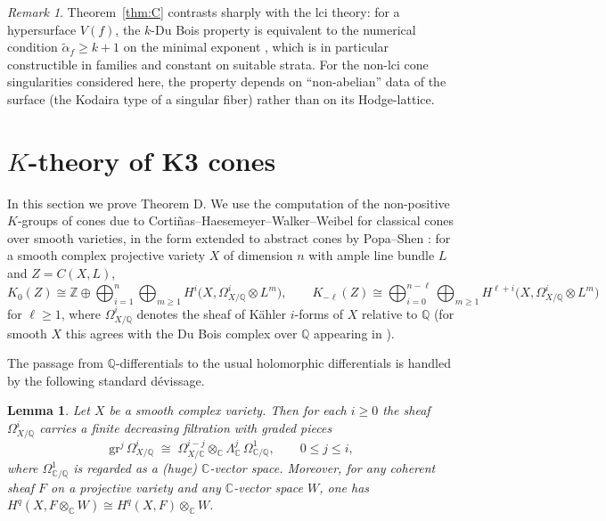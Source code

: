 \documentclass[11pt]{amsart}
\numberwithin{equation}{section}
\theoremstyle{plain}
\newtheorem{lemma}[theorem]{Lemma}
\theoremstyle{definition}
\theoremstyle{remark}
\newtheorem{remark}[theorem]{Remark}
\newcommand{\CC}{\mathbb{C}}
\newcommand{\QQ}{\mathbb{Q}}
\newcommand{\ZZ}{\mathbb{Z}}
\newcommand{\Kzero}{K_0}
\begin{document}
\begin{remark}
Theorem~\ref{thm:C} contrasts sharply with the lci theory: for a hypersurface $V(f)$, the $k$-Du Bois property is equivalent to the numerical condition $\widetilde\alpha_f\ge k+1$ on the minimal exponent \cite{MOPW,JKSY,Sai}, which is in particular constructible in families and constant on suitable strata.
For the non-lci cone singularities considered here, the property depends on ``non-abelian'' data of the surface (the Kodaira type of a singular fiber) rather than on its Hodge-lattice.
\end{remark}

\section{$K$-theory of K3 cones}\label{sec:ktheory}

In this section we prove Theorem D.
We use the computation of the non-positive $K$-groups of cones due to Corti\~nas--Haesemeyer--Walker--Weibel \cite{CHWW} for classical cones over smooth varieties, in the form extended to abstract cones by Popa--Shen \cite[Cor.~D]{PS}: for a smooth complex projective variety $X$ of dimension $n$ with ample line bundle $L$ and $Z=C(X,L)$,
\begin{equation}\label{eq:PS}
\Kzero(Z)\cong\ZZ\oplus\bigoplus_{i=1}^{n}\bigoplus_{m\ge1}H^i\!\big(X,\Omega^i_{X/\QQ}\otimes L^m\big),
\qquad
K_{-\ell}(Z)\cong\bigoplus_{i=0}^{n-\ell}\bigoplus_{m\ge1}H^{\ell+i}\!\big(X,\Omega^i_{X/\QQ}\otimes L^m\big)
\end{equation}
for $\ell\ge1$, where $\Omega^i_{X/\QQ}$ denotes the sheaf of K\"ahler $i$-forms of $X$ relative to $\QQ$ (for smooth $X$ this agrees with the Du Bois complex over $\QQ$ appearing in \cite{PS}).

The passage from $\QQ$-differentials to the usual holomorphic differentials is handled by the following standard d\'evissage.

\begin{lemma}\label{lem:Qdifferentials}
Let $X$ be a smooth complex variety. Then for each $i\ge0$ the sheaf $\Omega^i_{X/\QQ}$ carries a finite decreasing filtration with graded pieces
\[
\mathrm{gr}^j\,\Omega^i_{X/\QQ}\;\cong\;\Omega^{i-j}_{X/\CC}\otimes_{\CC}\Lambda^j_{\CC}\,\Omega^1_{\CC/\QQ},
\qquad 0\le j\le i,
\]
where $\Omega^1_{\CC/\QQ}$ is regarded as a (huge) $\CC$-vector space.
Moreover, for any coherent sheaf $F$ on a projective variety and any $\CC$-vector space $W$, one has $H^q(X,F\otimes_\CC W)\cong H^q(X,F)\otimes_\CC W$.
\end{lemma}
\end{document}
